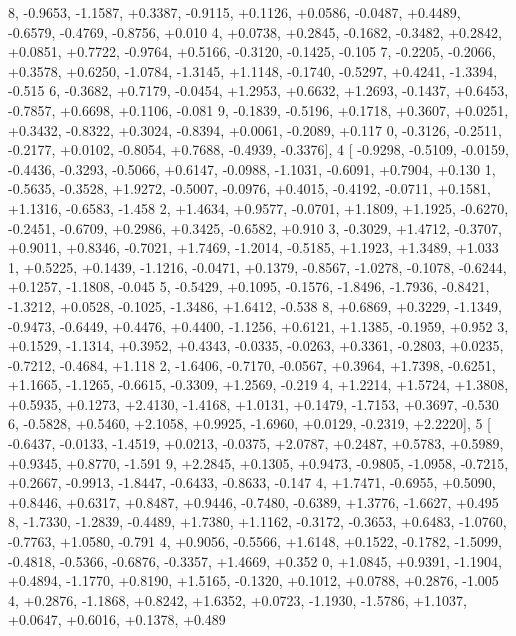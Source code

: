 \begin{DoxyCode}
      8, -0.9653, -1.1587, +0.3387, -0.9115, +0.1126, +0.0586, -0.0487, +0.4489, -0.6579, -0.4769, -0.8756, +0.010
      4, +0.0738, +0.2845, -0.1682, -0.3482, +0.2842, +0.0851, +0.7722, -0.9764, +0.5166, -0.3120, -0.1425, -0.105
      7, -0.2205, -0.2066, +0.3578, +0.6250, -1.0784, -1.3145, +1.1148, -0.1740, -0.5297, +0.4241, -1.3394, -0.515
      6, -0.3682, +0.7179, -0.0454, +1.2953, +0.6632, +1.2693, -0.1437, +0.6453, -0.7857, +0.6698, +0.1106, -0.081
      9, -0.1839, -0.5196, +0.1718, +0.3607, +0.0251, +0.3432, -0.8322, +0.3024, -0.8394, +0.0061, -0.2089, +0.117
      0, -0.3126, -0.2511, -0.2177, +0.0102, -0.8054, +0.7688, -0.4939, -0.3376],
4 [ -0.9298, -0.5109, -0.0159, -0.4436, -0.3293, -0.5066, +0.6147, -0.0988, -1.1031, -0.6091, +0.7904, +0.130
      1, -0.5635, -0.3528, +1.9272, -0.5007, -0.0976, +0.4015, -0.4192, -0.0711, +0.1581, +1.1316, -0.6583, -1.458
      2, +1.4634, +0.9577, -0.0701, +1.1809, +1.1925, -0.6270, -0.2451, -0.6709, +0.2986, +0.3425, -0.6582, +0.910
      3, -0.3029, +1.4712, -0.3707, +0.9011, +0.8346, -0.7021, +1.7469, -1.2014, -0.5185, +1.1923, +1.3489, +1.033
      1, +0.5225, +0.1439, -1.1216, -0.0471, +0.1379, -0.8567, -1.0278, -0.1078, -0.6244, +0.1257, -1.1808, -0.045
      5, -0.5429, +0.1095, -0.1576, -1.8496, -1.7936, -0.8421, -1.3212, +0.0528, -0.1025, -1.3486, +1.6412, -0.538
      8, +0.6869, +0.3229, -1.1349, -0.9473, -0.6449, +0.4476, +0.4400, -1.1256, +0.6121, +1.1385, -0.1959, +0.952
      3, +0.1529, -1.1314, +0.3952, +0.4343, -0.0335, -0.0263, +0.3361, -0.2803, +0.0235, -0.7212, -0.4684, +1.118
      2, -1.6406, -0.7170, -0.0567, +0.3964, +1.7398, -0.6251, +1.1665, -1.1265, -0.6615, -0.3309, +1.2569, -0.219
      4, +1.2214, +1.5724, +1.3808, +0.5935, +0.1273, +2.4130, -1.4168, +1.0131, +0.1479, -1.7153, +0.3697, -0.530
      6, -0.5828, +0.5460, +2.1058, +0.9925, -1.6960, +0.0129, -0.2319, +2.2220],
5 [ -0.6437, -0.0133, -1.4519, +0.0213, -0.0375, +2.0787, +0.2487, +0.5783, +0.5989, +0.9345, +0.8770, -1.591
      9, +2.2845, +0.1305, +0.9473, -0.9805, -1.0958, -0.7215, +0.2667, -0.9913, -1.8447, -0.6433, -0.8633, -0.147
      4, +1.7471, -0.6955, +0.5090, +0.8446, +0.6317, +0.8487, +0.9446, -0.7480, -0.6389, +1.3776, -1.6627, +0.495
      8, -1.7330, -1.2839, -0.4489, +1.7380, +1.1162, -0.3172, -0.3653, +0.6483, -1.0760, -0.7763, +1.0580, -0.791
      4, +0.9056, -0.5566, +1.6148, +0.1522, -0.1782, -1.5099, -0.4818, -0.5366, -0.6876, -0.3357, +1.4669, +0.352
      0, +1.0845, +0.9391, -1.1904, +0.4894, -1.1770, +0.8190, +1.5165, -0.1320, +0.1012, +0.0788, +0.2876, -1.005
      4, +0.2876, -1.1868, +0.8242, +1.6352, +0.0723, -1.1930, -1.5786, +1.1037, +0.0647, +0.6016, +0.1378, +0.489

\end{DoxyCode}
